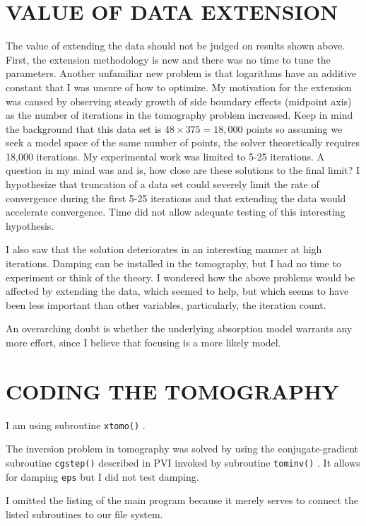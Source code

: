 \section{VALUE OF DATA EXTENSION}
The value of extending the data should not be judged
on results shown above.
First, the extension methodology is new and there was no time
to tune the parameters.
Another unfamiliar new problem is that logarithms have an additive constant
that I was unsure of how to optimize.
My motivation for the extension was caused by observing steady growth
of side boundary effects (midpoint axis) as the number of iterations
in the tomography problem increased.
Keep in mind the background that
this data set is $48\times 375=18,000$ points so assuming we seek
a model space of the same number of points,
the solver theoretically requires 18,000 iterations.
My experimental work was limited to  5-25 iterations.
A question in my mind was and is,
how close are these solutions to the final limit?
I hypothesize that truncation of a data set could severely
limit the rate of convergence during the first 5-25 iterations
and that extending the data would accelerate convergence.
Time did not allow adequate testing of this interesting hypothesis.
\par
I also saw that the solution
deteriorates in an interesting manner at high iterations.
Damping can be installed in the tomography,
but I had no time to experiment or think of the theory.
I wondered how the above problems would be affected by
extending the data, which seemed to help, but which
seems to have been less important than other variables,
particularly, the iteration count.
\par
An overarching doubt is whether the underlying absorption model
warrants any more effort, since I believe that focusing
is a more likely model.


\section{CODING THE TOMOGRAPHY }
I am using subroutine \texttt{xtomo()} .
\par
The inversion problem in tomography was solved
by using the conjugate-gradient subroutine {\tt cgstep()}
described in PVI invoked by subroutine \texttt{tominv()} .
It allows for damping {\tt eps} but I did not test damping.

I omitted the listing of the main program
because it merely serves to connect
the listed subroutines to our file system.



